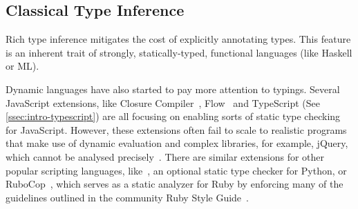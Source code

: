 \documentclass[acmsmall,nonacm]{acmart}\settopmatter{printfolios=true,printccs=false,printacmref=false}
\newcommand{\margincomment}[2]{\marginpar{\scriptsize\color{Maroon}#1 says: #2}}
\newcommand{\adg}[1]{\margincomment{ADG}{#1}}
\newcommand{\etb}[1]{\margincomment{Earl}{#1}}
\begin{document}
\subsection{Classical Type Inference}


Rich type inference mitigates the cost
of explicitly annotating types. This feature is an
inherent trait of strongly, statically-typed, functional languages (like Haskell or ML).


Dynamic languages have also started to pay more attention to typings. Several
JavaScript extensions, like Closure Compiler~\citep{closure}, Flow~\cite{flow} and
TypeScript (See \cref{ssec:intro-typescript}) are all focusing on enabling
sorts of static type checking for JavaScript.
%
%
However, these
extensions often fail to scale to realistic programs that make use of dynamic
evaluation and complex libraries, for example, jQuery, which cannot be analysed
precisely~\cite{jensen09}.
%
There are similar extensions for other popular scripting languages,
like~\citep{mypy}, an optional static type checker for Python,
or RuboCop~\citep{rubycop}, which serves as a static analyzer for Ruby by enforcing many of the guidelines
outlined in the community Ruby Style Guide~\citep{rubystyle}.
\end{document}
